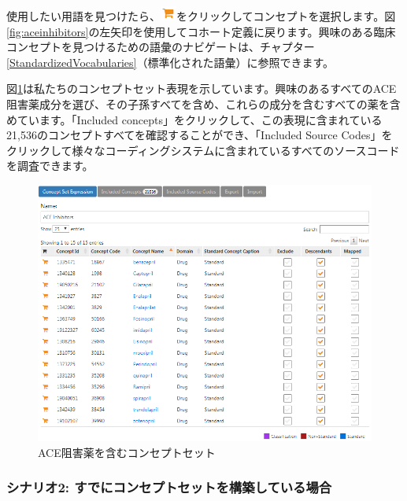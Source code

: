 \documentclass[
  11pt]{book}
\theoremstyle{definition}
\theoremstyle{definition}
\theoremstyle{definition}
\theoremstyle{definition}
\theoremstyle{remark}
\begin{document}
使用したい用語を見つけたら、\includegraphics{images/Cohorts/shoppingcart.png}をクリックしてコンセプトを選択します。図\ref{fig:aceinhibitors}の左矢印を使用してコホート定義に戻ります。興味のある臨床コンセプトを見つけるための語彙のナビゲートは、チャプター\ref{StandardizedVocabularies}（標準化された語彙）に参照できます。

図\ref{fig:aceConceptSetExpression}は私たちのコンセプトセット表現を示しています。興味のあるすべてのACE阻害薬成分を選び、その子孫すべてを含め、これらの成分を含むすべての薬を含めています。「Included concepts」をクリックして、この表現に含まれている21,536のコンセプトすべてを確認することができ、「Included Source Codes」をクリックして様々なコーディングシステムに含まれているすべてのソースコードを調査できます。

\begin{figure}

{\centering \includegraphics[width=1\linewidth]{images/Cohorts/aceConceptSetExpression} 

}

\caption{ACE阻害薬を含むコンセプトセット}\label{fig:aceConceptSetExpression}
\end{figure}

\subsubsection*{シナリオ2: すでにコンセプトセットを構築している場合}\label{ux30b7ux30caux30eaux30aa2-ux3059ux3067ux306bux30b3ux30f3ux30bbux30d7ux30c8ux30bbux30c3ux30c8ux3092ux69cbux7bc9ux3057ux3066ux3044ux308bux5834ux5408}
\end{document}
